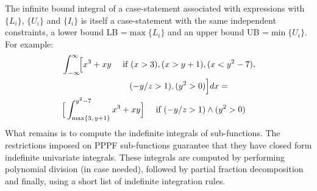 \documentclass{article}
\newcommand{\singlecase}[2]{#2 \quad \text{ if } #1}
\begin{document}
The infinite bound integral of a case-statement 
associated with expressions with $\{L_i\}$, $\{U_i\}$ and $\{I_i\}$ 
is itself a case-statement with the same independent constraints,
a lower bound LB =$\max\{L_i\}$ and 
an upper bound UB =$ \min\{U_i\}$.
For example:
{\footnotesize 
\begin{align*}
&\int_{-\infty}^{\infty}\!\! \Big[
\singlecase{(x>3), (x>y+1), (x<y^2-7), \\
&\hspace{28mm} (-y/z > 1) , (y^2>0)}
{x^3 + xy} \Big] dx = \\
&\singlecase{(-y/z > 1) \wedge (y^2>0)}
{\Big[ \int_{\max\{3, \, y+1\}}^{y^2 - 7}x^3 + xy \Big]} 
\end{align*}  
}
What remains is to compute the indefinite integrals of sub-functions. 
The restrictions imposed on PPPF sub-functions 
guarantee that they have closed form indefinite univariate integrals.
These integrals are computed by performing polynomial division (in case needed),
followed by partial fraction decomposition and finally, using a short list of indefinite integration rules.
\end{document}
